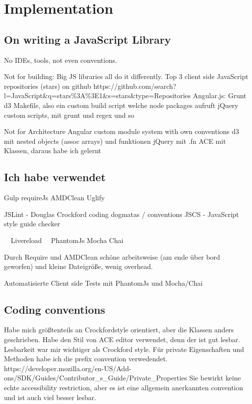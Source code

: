 \chapter{Implementation}

\section{On writing a JavaScript Library}

No IDEs, tools, not even conventions.

Not for building:
Big JS libraries all do it differently.
Top 3 client side JavaScript repositories (stars) on github
https://github.com/search?l=JavaScript\&q=stars\%3A\%3E1\&s=stars\&type=Repositories
Angular.js: Grunt
d3 Makefile, also ein custom build script welche node packages aufruft
jQuery custom scripts, mit grunt und regex und so

Not for Architecture
Angular custom module system with own conventions
d3 mit nested objects (assoc arrays) und funktionen
jQuery mit .fn
ACE mit Klassen, daraus habe ich gelernt


\section{Ich habe verwendet}

Gulp
requireJs
AMDClean
Uglify

JSLint - Douglas Crockford coding dogmatas / conventions
JSCS - JavaScript style guide checker

~~Livereload~~
PhantomJs
Mocha
Chai

Durch Require und AMDClean schöne arbeitsweise (am ende über bord geworfen) und kleine Dateigröße, wenig overhead.

Automatisierte Client side Tests mit PhantomJs und Mocha/Chai


\section{Coding conventions}

Habe mich größtenteils an Crockfordstyle orientiert, aber die Klassen anders geschrieben. Habe den Stil von ACE editor verwendet, denn der ist gut lesbar. Lesbarkeit war mir wichtiger als Crockford style. Für private Eigenschaften und Methoden habe ich die prefix convention verwedendet.
https://developer.mozilla.org/en-US/Add-ons/SDK/Guides/Contributor\_s\_Guide/Private\_Properties
Sie bewirkt keine echte accessibility restriction, aber es ist eine allgemein anerkannten convention und ist auch viel besser lesbar.

